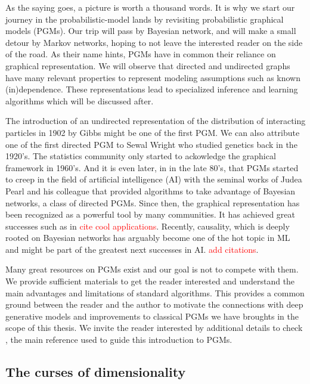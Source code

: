 As the saying goes, a picture is worth a thousand words. It is why we start our journey in the probabilistic-model lands by revisiting probabilistic graphical models (PGMs). Our trip will pass by Bayesian network, and will make a small detour by Markov networks, hoping to not leave the interested reader on the side of the road. As their name hints, PGMs have in common their reliance on graphical representation. We will observe that directed and undirected graphs have many relevant properties to represent modeling assumptions such as known (in)dependence. These representations lead to specialized inference and learning algorithms which will be discussed after.

The introduction of an undirected representation of the distribution of interacting particles in 1902 by Gibbs might be one of the first PGM. We can also attribute one of the first directed PGM to Sewal Wright who studied genetics back in the 1920's. The statistics community only started to ackowledge the graphical framework in 1960's. And it is even later, in in the late 80's, that PGMs started to creep in the field of artificial intelligence (AI) with the seminal works of Judea Pearl and his colleague that provided algorithms to take advantage of Bayesian networks, a class of directed PGMs. Since then, the graphical representation has been recognized as a powerful tool by many communities. It has achieved great successes such as in \textcolor{red}{cite cool applications}. Recently, causality, which is deeply rooted on Bayesian networks has arguably become one of the hot topic in ML and might be part of the greatest next successes in AI. \textcolor{red}{add citations}.

Many great resources on PGMs exist and our goal is not to compete with them. We provide sufficient materials to get the reader interested and understand the main advantages and limitations of standard algorithms. This provides a common ground between the reader and the author to motivate the connections with deep generative models and improvements to classical PGMs we have broughts in the scope of this thesis. We invite the reader interested by additional details to check \citet{}, the main reference used to guide this introduction to PGMs.

\subsection{The curses of dimensionality}
